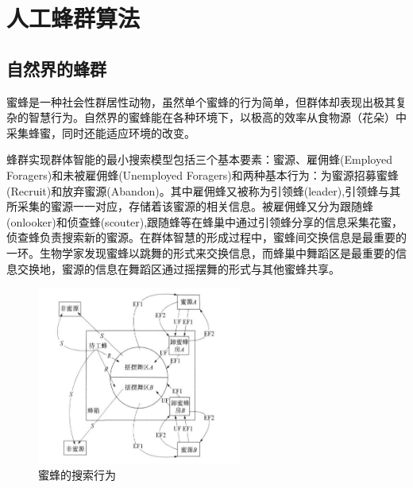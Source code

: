 \documentclass[a4paper,12pt]{report}
\begin{document}
\chapter{人工蜂群算法}
\setcounter{page}{1}
\begin{spacing}{1.5}
\songti{}

\section{自然界的蜂群}
		蜜蜂是一种社会性群居性动物，虽然单个蜜蜂的行为简单，但群体却表现出极其复杂的智慧行为。自然界的蜜蜂能在各种环境下，以极高的效率从食物源（花朵）中采集蜂蜜，同时还能适应环境的改变。

		蜂群实现群体智能的最小搜索模型包括三个基本要素：蜜源、雇佣蜂(Employed Foragers)和未被雇佣蜂(Unemployed Foragers)和两种基本行为：为蜜源招募蜜蜂(Recruit)和放弃蜜源(Abandon)。其中雇佣蜂又被称为引领蜂(leader),引领蜂与其所采集的蜜源一一对应，存储着该蜜源的相关信息。被雇佣蜂又分为跟随蜂(onlooker)和侦查蜂(scouter),跟随蜂等在蜂巢中通过引领蜂分享的信息采集花蜜，侦查蜂负责搜索新的蜜源。在群体智慧的形成过程中，蜜蜂间交换信息是最重要的一环。生物学家发现蜜蜂以跳舞的形式来交换信息，而蜂巢中舞蹈区是最重要的信息交换地，蜜源的信息在舞蹈区通过摇摆舞的形式与其他蜜蜂共享。

			\begin{figure}[tbp]
				\centering
				\includegraphics[width=0.6\textwidth]{pic/bee4.jpg}
				\caption{蜜蜂的搜索行为}
				\label{fig:pt1}
			\end{figure}


\end{spacing}
\end{document}
